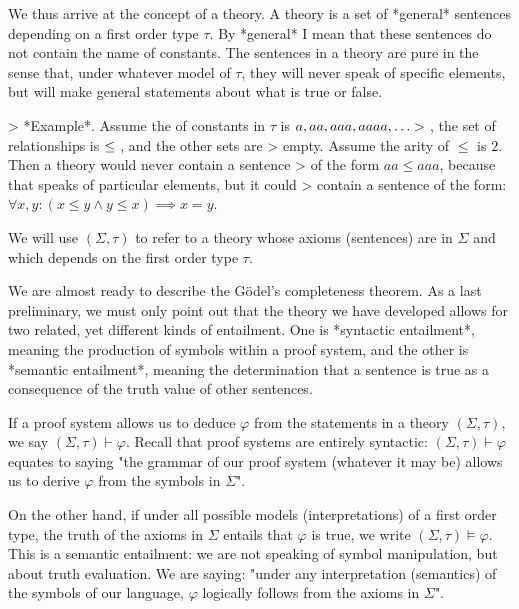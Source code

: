\documentclass[a4paper, 12pt]{article}
\begin{document}
We thus arrive at the concept of a theory. A theory is a set of *general*
sentences depending on a first order type $\tau$. By *general* I mean that
these sentences do not contain the name of constants. The sentences in a theory
are pure in the sense that, under whatever model of $\tau$, they will never
speak of specific elements, but will make general statements about what is true
or false. 

> *Example*. Assume the of constants in $\tau$ is $\\{ a, aa, aaa, aaaa, \ldots
> \\}$, the set of relationships is $\\{ \leq \\}$, and the other sets are
> empty. Assume the arity of $\leq$ is $2$. Then a theory would never contain a sentence 
> of the form $aa \leq aaa$, because that speaks of particular elements, but it could 
> contain a sentence of the form: $\forall x, y: (x \leq y \land y \leq x) \implies x = y$.

We will use $(\Sigma, \tau)$ to refer to a theory whose axioms (sentences) are in $\Sigma$ and 
which depends on the first order type $\tau$.

We are almost ready to describe the Gödel's completeness theorem. As a last
preliminary, we must only point out that the theory we have developed allows for two
related, yet different kinds of entailment. One is *syntactic entailment*,
meaning the production of symbols within a proof system, and the other 
is *semantic entailment*, meaning the determination that a sentence is true 
as a consequence of the truth value of other sentences.

If a proof system allows us to deduce $\varphi$ from the statements in a theory
$(\Sigma, \tau)$, we say $(\Sigma, \tau) \vdash \varphi$. Recall that proof
systems are entirely syntactic: $(\Sigma, \tau) \vdash \varphi$ equates to
saying "the grammar of our proof system (whatever it may be) allows us to
derive $\varphi$ from the symbols in $\Sigma$".

On the other hand, if under all possible models (interpretations) of a first
order type, the truth of the axioms in $\Sigma$ entails that $\varphi$ is true,
we write $(\Sigma, \tau) \vDash \varphi$. This is a semantic entailment: we are
not speaking of symbol manipulation, but about truth evaluation. We are saying:
"under any interpretation (semantics) of the symbols of our language, $\varphi$
logically follows from the axioms in $\Sigma$".
\end{document}
